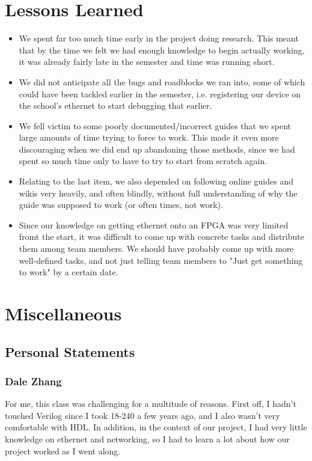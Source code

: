 \documentclass[12pt]{report}
\begin{document}
\chapter{Lessons Learned}
\begin{itemize}
\item We spent far too much time early in the project doing research. This meant that by the time we felt we had enough knowledge to begin actually working, it was already fairly late in the semester and time was running short.
\item We did not anticipate all the bugs and roadblocks we ran into, some of which could have been tackled earlier in the semester, i.e. registering our device on the school's ethernet to start debugging that earlier.
\item We fell victim to some poorly documented/incorrect guides that we spent large amounts of time trying to force to work. This made it even more discouraging when we did end up abandoning those methods, since we had spent so much time only to have to try to start from scratch again.
\item Relating to the last item, we also depended on following online guides and wikis very heavily, and often blindly, without full understanding of why the guide was supposed to work (or often times, not work).
\item Since our knowledge on getting ethernet onto an FPGA was very limited fromt the start, it was difficult to come up with concrete tasks and distribute them among team members. We should have probably come up with more well-defined tasks, and not just telling team members to "Just get something to work" by a certain date.
\end{itemize}


\chapter{Miscellaneous}
\section{Personal Statements}
\subsection{Dale Zhang}
For me, this class was challenging for a multitude of reasons. First off, I hadn't touched Verilog since I took 18-240 a few years ago, and I also wasn't very comfortable with HDL. In addition, in the context of our project, I had very little knowledge on ethernet and networking, so I had to learn a lot about how our project worked as I went along.
\end{document}
